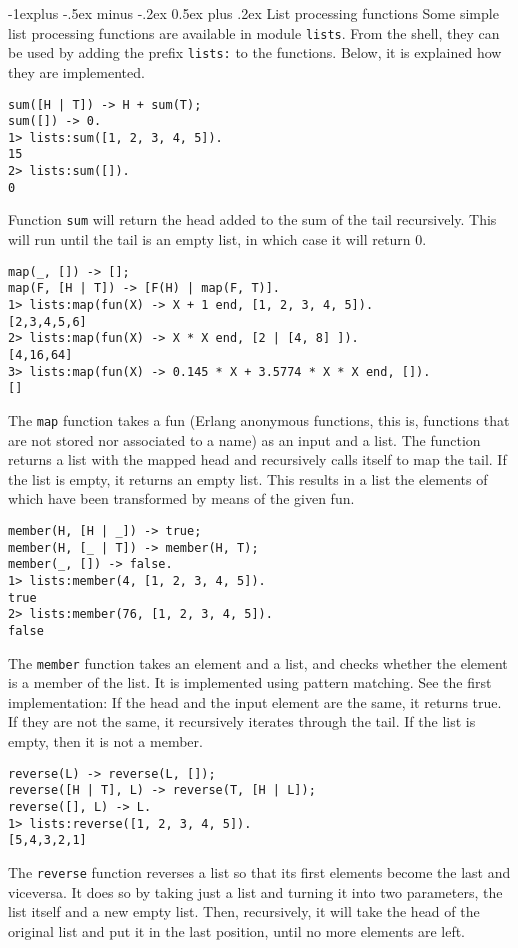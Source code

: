 \documentclass[10pt,landscape]{article}
\makeatletter
\renewcommand{\subsection}{\@startsection{subsection}{2}{0mm}%
                                {-1explus -.5ex minus -.2ex}%
                                {0.5ex plus .2ex}%
                                {\normalfont\normalsize\bfseries}}
\makeatother
\begin{document}
\begin{multicols}{3}
\subsection{List processing functions}
Some simple list processing functions are available in module \texttt{lists}. From the shell, they can be used by adding the prefix \texttt{lists:} to the functions. Below, it is explained how they are implemented.
\begin{verbatim}
sum([H | T]) -> H + sum(T);
sum([]) -> 0.
1> lists:sum([1, 2, 3, 4, 5]).
15
2> lists:sum([]).
0
\end{verbatim}
Function \texttt{sum} will return the head added to the sum of the tail recursively. This will run until the tail is an empty list, in which case it will return 0.
\begin{verbatim}
map(_, []) -> [];
map(F, [H | T]) -> [F(H) | map(F, T)].
1> lists:map(fun(X) -> X + 1 end, [1, 2, 3, 4, 5]).
[2,3,4,5,6]
2> lists:map(fun(X) -> X * X end, [2 | [4, 8] ]).
[4,16,64]
3> lists:map(fun(X) -> 0.145 * X + 3.5774 * X * X end, []).
[]
\end{verbatim}
The \texttt{map} function takes a fun (Erlang anonymous functions, this is, functions that are not stored nor associated to a name) as an input and a list. The function returns a list with the mapped head and recursively calls itself to map the tail. If the list is empty, it returns an empty list. This results in a list the elements of which have been transformed by means of the given fun.
\begin{verbatim}
member(H, [H | _]) -> true;
member(H, [_ | T]) -> member(H, T);
member(_, []) -> false.
1> lists:member(4, [1, 2, 3, 4, 5]).
true
2> lists:member(76, [1, 2, 3, 4, 5]).
false
\end{verbatim}
The \texttt{member} function takes an element and a list, and checks whether the element is a member of the list. It is implemented using pattern matching. See the first implementation: If the head and the input element are the same, it returns true. If they are not the same, it recursively iterates through the tail. If the list is empty, then it is not a member.
\begin{verbatim}
reverse(L) -> reverse(L, []);
reverse([H | T], L) -> reverse(T, [H | L]);
reverse([], L) -> L.
1> lists:reverse([1, 2, 3, 4, 5]).
[5,4,3,2,1]
\end{verbatim}
The \texttt{reverse} function reverses a list so that its first elements become the last and viceversa. It does so by taking just a list and turning it into two parameters, the list itself and a new empty list. Then, recursively, it will take the head of the original list and put it in the last position, until no more elements are left.

\end{multicols}
\end{document}
